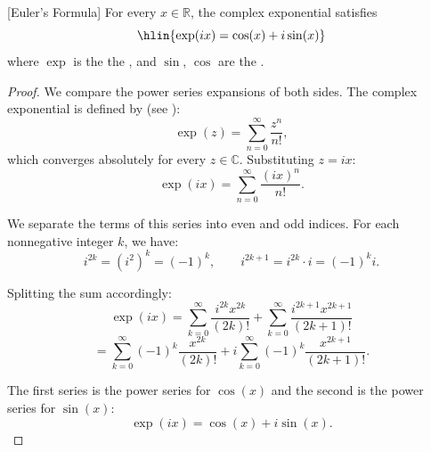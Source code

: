 \begin{theorem} \label{theorem:eulers_formula_for_complex_exponential}
[Euler's Formula] For every $x \in \mathbb{R}$, the complex exponential satisfies
$$\hlin{\exp(ix) = \cos(x) + i\sin(x)}$$
where $\exp$ is the  the , and $\sin$, $\cos$ are the .
\end{theorem}
\begin{proof}
    We compare the power series expansions of both sides. The complex exponential is defined by (see ):
    $$\exp(z) = \sum_{n=0}^\infty \frac{z^n}{n!},$$
    which converges absolutely for every $z \in \mathbb{C}$. Substituting $z = ix$:
    $$\exp(ix) = \sum_{n=0}^\infty \frac{(ix)^n}{n!}.$$

    We separate the terms of this series into even and odd indices. For each nonnegative integer $k$, we have:
    $$i^{2k} = (i^2)^k = (-1)^k, \qquad i^{2k+1} = i^{2k} \cdot i = (-1)^k i.$$

    Splitting the sum accordingly:
    $$\exp(ix) = \sum_{k=0}^\infty \frac{i^{2k} x^{2k}}{(2k)!} + \sum_{k=0}^\infty \frac{i^{2k+1} x^{2k+1}}{(2k+1)!}$$
    $$= \sum_{k=0}^\infty (-1)^k \frac{x^{2k}}{(2k)!} + i \sum_{k=0}^\infty (-1)^k \frac{x^{2k+1}}{(2k+1)!}.$$

    The first series is the power series for $\cos(x)$ and the second is the power series for $\sin(x)$:
    $$\exp(ix) = \cos(x) + i\sin(x).$$
\end{proof}
